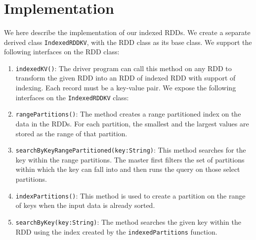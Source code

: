 \section{Implementation} 
\label{sec:implementation}
\paragraph{}
We here describe the implementation of our indexed RDDs. We create a
separate derived class \texttt{IndexedRDDKV}, with the RDD class as its
base class. We support the following interfaces on the RDD class:

\begin{enumerate}
\item \texttt{indexedKV()}: The driver program can call this method on
    any RDD to transform the given RDD into an RDD of indexed RDD with
    support of indexing. Each record must be a key-value pair. 
    We expose the following interfaces on the \texttt{IndexedRDDKV}
    class:
\item \texttt{rangePartitions()}: The method creates a range partitioned
    index on the data in the RDDs. For each partition, the smallest and
    the largest values are stored as the range of that partition.
\item \texttt{searchByKeyRangePartitioned(key:String)}: This method
    searches for the key within the range partitions. The master first
    filters the set of partitions within which the key can fall into and
    then runs the query on those select partitions. 
\item \texttt{indexPartitions()}: This method is used to
    create a partition on the range of keys when the input data is
    already sorted. 
\item \texttt{searchByKey(key:String)}: The method searches the given
    key within the RDD using the index created by the
    \texttt{indexedPartitions} function. 
\end{enumerate}
